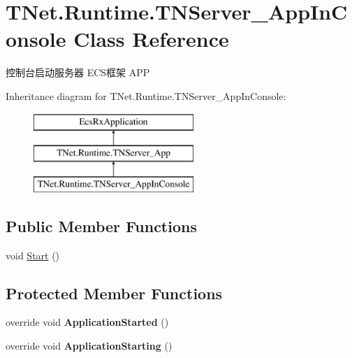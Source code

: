 \hypertarget{class_t_net_1_1_runtime_1_1_t_n_server___app_in_console}{}\section{T\+Net.\+Runtime.\+T\+N\+Server\+\_\+\+App\+In\+Console Class Reference}
\label{class_t_net_1_1_runtime_1_1_t_n_server___app_in_console}


控制台启动服务器 E\+C\+S框架 A\+PP  


Inheritance diagram for T\+Net.\+Runtime.\+T\+N\+Server\+\_\+\+App\+In\+Console\+:\begin{figure}[H]
\begin{center}
\leavevmode
\includegraphics[height=3.000000cm]{class_t_net_1_1_runtime_1_1_t_n_server___app_in_console}
\end{center}
\end{figure}
\subsection*{Public Member Functions}
\begin{DoxyCompactItemize}
\item 
void \mbox{\hyperlink{class_t_net_1_1_runtime_1_1_t_n_server___app_in_console_aac219c9a301d5201e81c30caf6945eb0}{Start}} ()
\end{DoxyCompactItemize}
\subsection*{Protected Member Functions}
\begin{DoxyCompactItemize}
\item 
\mbox{\label{class_t_net_1_1_runtime_1_1_t_n_server___app_in_console_aeca83a6abaef469e4019340c633b3578}} 
override void {\bfseries Application\+Started} ()
\item 
\mbox{\label{class_t_net_1_1_runtime_1_1_t_n_server___app_in_console_a7633cefec60935a0ab79460b4c068bd2}} 
override void {\bfseries Application\+Starting} ()
\end{DoxyCompactItemize}
